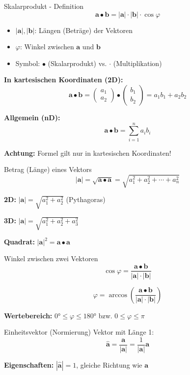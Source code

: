 \documentclass[a4paper, fontsize=7pt]{scrartcl}
\begin{document}
\begin{mainbox}{Skalarprodukt - Definition}
$$\mathbf{a} \bullet \mathbf{b} = |\mathbf{a}| \cdot |\mathbf{b}| \cdot \cos \varphi$$

\begin{itemize}
    \item $|\mathbf{a}|, |\mathbf{b}|$: Längen (Beträge) der Vektoren
    \item $\varphi$: Winkel zwischen $\mathbf{a}$ und $\mathbf{b}$
    \item Symbol: $\bullet$ (Skalarprodukt) vs. $\cdot$ (Multiplikation)
\end{itemize}

\textbf{In kartesischen Koordinaten (2D):}
$$\mathbf{a} \bullet \mathbf{b} = \begin{pmatrix} a_1 \\ a_2 \end{pmatrix} \bullet \begin{pmatrix} b_1 \\ b_2 \end{pmatrix} = a_1 b_1 + a_2 b_2$$

\textbf{Allgemein (nD):}
$$\mathbf{a} \bullet \mathbf{b} = \sum_{i=1}^{n} a_i b_i$$

\textbf{Achtung:} Formel gilt nur in kartesischen Koordinaten!
\end{mainbox}

\begin{mainbox}{Betrag (Länge) eines Vektors}
$$|\mathbf{a}| = \sqrt{\mathbf{a} \bullet \mathbf{a}} = \sqrt{a_1^2 + a_2^2 + \cdots + a_n^2}$$

\textbf{2D:} $|\mathbf{a}| = \sqrt{a_1^2 + a_2^2}$ (Pythagoras)

\textbf{3D:} $|\mathbf{a}| = \sqrt{a_1^2 + a_2^2 + a_3^2}$

\textbf{Quadrat:} $|\mathbf{a}|^2 = \mathbf{a} \bullet \mathbf{a}$
\end{mainbox}

\begin{mainbox}{Winkel zwischen zwei Vektoren}
$$\cos \varphi = \frac{\mathbf{a} \bullet \mathbf{b}}{|\mathbf{a}| \cdot |\mathbf{b}|}$$

$$\varphi = \arccos \left( \frac{\mathbf{a} \bullet \mathbf{b}}{|\mathbf{a}| \cdot |\mathbf{b}|} \right)$$

\textbf{Wertebereich:} $0° \leq \varphi \leq 180°$ bzw. $0 \leq \varphi \leq \pi$
\end{mainbox}

\begin{mainbox}{Einheitsvektor (Normierung)}
Vektor mit Länge 1:
$$\hat{\mathbf{a}} = \frac{\mathbf{a}}{|\mathbf{a}|} = \frac{1}{|\mathbf{a}|} \mathbf{a}$$

\textbf{Eigenschaften:} $|\hat{\mathbf{a}}| = 1$, gleiche Richtung wie $\mathbf{a}$
\end{mainbox}
\end{document}
